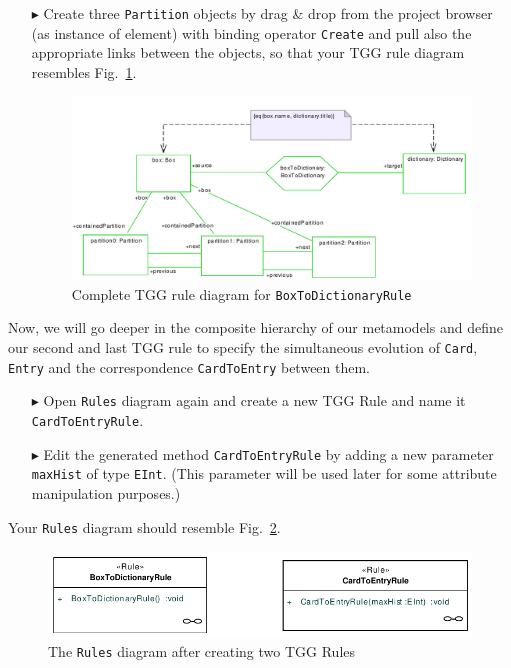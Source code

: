 \begin{enumerate}
\item[$\blacktriangleright$] Create three \texttt{Partition} objects by drag \& drop from the project browser (as instance of element) with binding operator \texttt{Create} and pull also the appropriate links between the objects, so that your TGG rule diagram resembles Fig.~\ref{fig:boxtodictionaryrule_complete}.

\begin{figure}[htbp]
\begin{center}
  \includegraphics[width=\textwidth]{pics/tggBilder/tggRule/tgg15}
  \caption{Complete TGG rule diagram for \texttt{BoxToDictionaryRule}}  
  \label{fig:boxtodictionaryrule_complete}
\end{center}
\end{figure}

\end{enumerate}

\clearpage
Now, we will go deeper in the composite hierarchy of our metamodels and define our second and last TGG rule to specify the simultaneous evolution of \texttt{Card}, \texttt{Entry} and the correspondence \texttt{CardToEntry} between them.

\begin{enumerate}
\item[$\blacktriangleright$] Open \texttt{Rules} diagram again and create a new TGG Rule and name it \texttt{CardToEntryRule}.
\item[$\blacktriangleright$] Edit the generated method \texttt{CardToEntryRule} by adding a new parameter \texttt{maxHist} of type \texttt{EInt}. 
(This parameter will be used later for some attribute manipulation purposes.)
\end{enumerate}

Your \texttt{Rules} diagram should resemble Fig.~\ref{fig:rules_diagram}.

\begin{figure}[htbp]
\begin{center}
  \includegraphics[width=\textwidth]{pics/tggBilder/tggRule/tgg16}
  \caption{The \texttt{Rules} diagram after creating two TGG Rules}  
  \label{fig:rules_diagram}
\end{center}
\end{figure}

